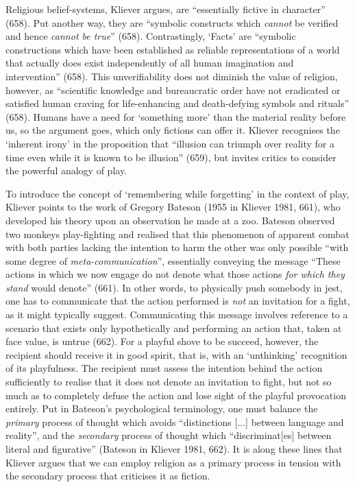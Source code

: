 \documentclass[Draft.tex]{subfiles}
\begin{document}
Religious belief-systems, Kliever argues,
are ``essentially fictive in character'' (658).
Put another way, they are
``symbolic constructs which \textit{cannot} be verified
and hence \textit{cannot be true}'' (658).
Contrastingly, `Facts' are
``symbolic constructions which have been established as
reliable representations of a world that actually does exist
independently of all human imagination and intervention'' (658).
This unverifiability does not diminish the value of religion,
however, as ``scientific knowledge and bureaucratic order
have not eradicated or satisfied human craving
for life-enhancing and death-defying symbols and rituals'' (658).
Humans have a need for `something more' than
the material reality before us, so the argument goes,
which only fictions can offer it.
Kliever recognises the `inherent irony' in the proposition that
``illusion can triumph over reality for a time
even while it is known to be illusion'' (659),
but invites critics to consider the powerful analogy of play.

To introduce the concept of `remembering while forgetting'
in the context of play, Kliever points to the work of
Gregory Bateson (1955 in Kliever 1981, 661),
who developed his theory upon an observation he made at a zoo.
Bateson observed two monkeys play-fighting and realised that
this phenomenon of apparent combat with both parties lacking
the intention to harm the other was only possible
``with some degree of \textit{meta-communication}'',
essentially conveying the message
``These actions in which we now engage do not denote
what those actions \textit{for which they stand} would denote'' (661).
In other words, to physically push somebody in jest,
one has to communicate that the action performed
is \textit{not} an invitation for a fight, as it might typically suggest.
Communicating this message involves reference to
a scenario that exists only hypothetically and
performing an action that, taken at face value, is untrue (662).
For a playful shove to be succeed, however,
the recipient should receive it in good spirit, that is,
with an `unthinking' recognition of its playfulness.
The recipient must assess the intention behind the action sufficiently
to realise that it does not denote an invitation to fight,
but not so much as to completely defuse the action
and lose sight of the playful provocation entirely.
Put in Bateson's psychological terminology,
one must balance the \textit{primary} process of thought which
avoids ``distinctions [...] between language and reality'',
and the \textit{secondary} process of thought
which ``discriminat[es] between literal and figurative''
(Bateson in Kliever 1981, 662).
It is along these lines that Kliever argues that we can
employ religion as a primary process in tension with
the secondary process that criticises it as fiction.
\end{document}
